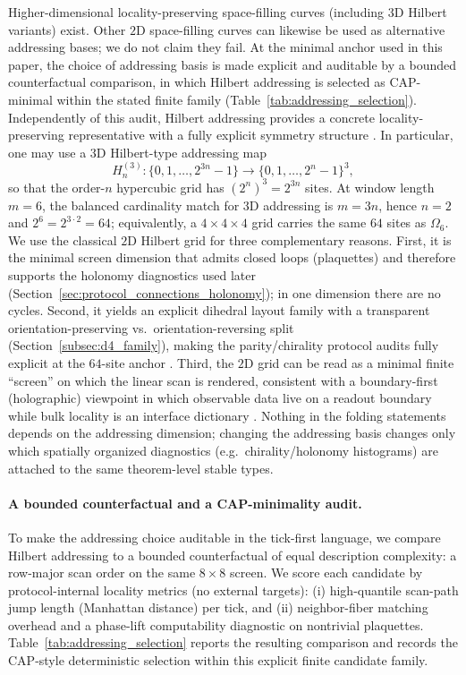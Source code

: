 \begin{remark}\label{rem:why_2d_hilbert}
Higher-dimensional locality-preserving space-filling curves (including $3$D Hilbert variants) exist.
Other $2$D space-filling curves can likewise be used as alternative addressing bases; we do not claim they fail.
At the minimal anchor used in this paper, the choice of addressing basis is made explicit and auditable by a bounded counterfactual comparison, in which Hilbert addressing is selected as CAP-minimal within the stated finite family (Table~\ref{tab:addressing_selection}).
Independently of this audit, Hilbert addressing provides a concrete locality-preserving representative with a fully explicit symmetry structure \cite{Sagan1994}.
In particular, one may use a $3$D Hilbert-type addressing map
\[
H_n^{(3)}:\{0,1,\dots,2^{3n}-1\}\to \{0,1,\dots,2^n-1\}^3,
\]
so that the order-$n$ hypercubic grid has $(2^n)^3=2^{3n}$ sites.
At window length $m=6$, the balanced cardinality match for $3$D addressing is $m=3n$, hence $n=2$ and $2^6=2^{3\cdot 2}=64$; equivalently, a $4\times 4\times 4$ grid carries the same $64$ sites as $\Omega_6$.
We use the classical $2$D Hilbert grid for three complementary reasons.
First, it is the minimal screen dimension that admits closed loops (plaquettes) and therefore supports the holonomy diagnostics used later (Section~\ref{sec:protocol_connections_holonomy}); in one dimension there are no cycles.
Second, it yields an explicit dihedral layout family with a transparent orientation-preserving vs.\ orientation-reversing split (Section~\ref{subsec:d4_family}), making the parity/chirality protocol audits fully explicit at the $64$-site anchor \cite{Sagan1994}.
Third, the $2$D grid can be read as a minimal finite ``screen'' on which the linear scan is rendered, consistent with a boundary-first (holographic) viewpoint in which observable data live on a readout boundary while bulk locality is an interface dictionary \cite{tHooft1993,Susskind1995,Bousso2002}.
Nothing in the folding statements depends on the addressing dimension; changing the addressing basis changes only which spatially organized diagnostics (e.g.\ chirality/holonomy histograms) are attached to the same theorem-level stable types.

\paragraph{A bounded counterfactual and a CAP-minimality audit.}
To make the addressing choice auditable in the tick-first language, we compare Hilbert addressing to a bounded counterfactual of equal description complexity: a row-major scan order on the same $8\times 8$ screen.
We score each candidate by protocol-internal locality metrics (no external targets): (i) high-quantile scan-path jump length (Manhattan distance) per tick, and (ii) neighbor-fiber matching overhead and a phase-lift computability diagnostic on nontrivial plaquettes.
Table~\ref{tab:addressing_selection} reports the resulting comparison and records the CAP-style deterministic selection within this explicit finite candidate family.
\end{remark}

